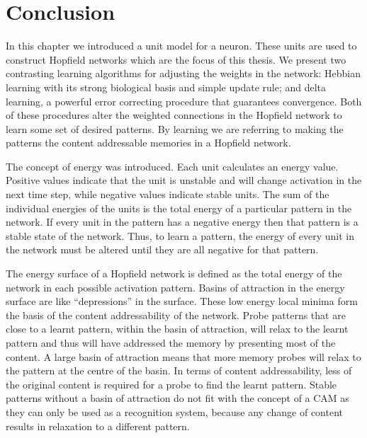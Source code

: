 \section{Conclusion}

In this chapter we introduced a unit model for a neuron.  These units are used to construct Hopfield networks which are the focus of this thesis.  We present two contrasting learning algorithms for adjusting the weights in the network: Hebbian learning with its strong biological basis and simple update rule; and delta learning, a powerful error correcting procedure that guarantees convergence. Both of these procedures alter the weighted connections in the Hopfield network to learn some set of desired patterns. By learning we are referring to making the patterns the content addressable memories in a Hopfield network.

The concept of energy was introduced.  Each unit calculates an energy value.  Positive values indicate that the unit is unstable and will change activation in the next time step, while negative values indicate stable units.  The sum of the individual energies of the units is the total energy of a particular pattern in the network.  If every unit in the pattern has a negative energy then that pattern is a stable state of the network.  Thus, to learn a pattern, the energy of every unit in the network must be altered until they are all negative for that pattern. 

The energy surface of a Hopfield network is defined as the total energy of the network in each possible activation pattern.  Basins of attraction in the energy surface are like ``depressions'' in the surface.  These low energy local minima form the basis of the content addressability of the network.  Probe patterns that are close to a learnt pattern, within the basin of attraction, will relax to the learnt pattern and thus will have addressed the memory by presenting most of the content.  A large basin of attraction means that more memory probes will relax to the pattern at the centre of the basin.  In terms of content addressability, less of the original content is required for a probe to find the learnt pattern.  Stable patterns without a basin of attraction do not fit with the concept of a CAM as they can only be used as a recognition system, because any change of content results in relaxation to a different pattern.


